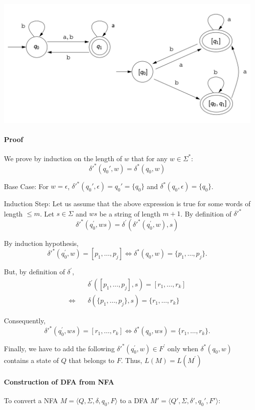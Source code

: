 \documentclass[9pt, twocolumn]{extarticle}
\begin{document}
\includegraphics[width=0.95\columnwidth]{assets/NFA-DFA.png}

\paragraph{Proof}
We prove by induction on the length of $w$ that for any $w \in \Sigma^*$:
\[ \delta'^*(q_0', w) = \delta^*(q_0, w) \]

Base Case: For $w = \epsilon$, $\delta'^*(q_0', \epsilon) = q_0' = \{q_0\}$ and $\delta^*(q_0, \epsilon) = \{q_0\}$.

Induction Step:
Let us assume that the above expression is true for some words of length $\leq m$. Let $s \in \Sigma$ and $w s$ be a string of length $m+1$. By definition of $\delta'^*$
$$
  \delta'^*(q_0^{\prime}, w s)=\delta^{\prime}(\delta'^*(q_0^{\prime}, w), s)
$$

By induction hypothesis,
$$
  \delta'^*(q_0^{\prime}, w)=[p_1, \ldots, p_j] \Longleftrightarrow \delta^*(q_0, w)=\{p_1, \ldots, p_j\} .
$$

But, by definition of $\delta^{\prime}$,
$$\begin{aligned}
                             & \delta^{\prime}([p_1, \ldots, p_j], s)=[r_1, \ldots, r_k] \\
    \Longleftrightarrow\quad & \delta(\{p_1, \ldots, p_j\}, s)=\{r_1, \ldots, r_k\}
  \end{aligned}$$

Consequently,
$$
  \delta'^*(q_0^{\prime}, w s)=[r_1, \ldots, r_k] \Longleftrightarrow \delta^*(q_0, w s)=\{r_1, \ldots, r_k\} .
$$

Finally, we have to add the following $\delta'^*(q_0^{\prime}, w) \in F^{\prime}$ only when $\delta^*(q_0, w)$ contains a state of $Q$ that belongs to $F$. Thus, $L(M)=L(M^{\prime})$

\paragraph{Construction of DFA from NFA}
To convert a NFA $M = \langle Q, \Sigma, \delta, q_0, F \rangle$ to a DFA $M' = \langle Q', \Sigma, \delta', q_0', F' \rangle$:
\end{document}
